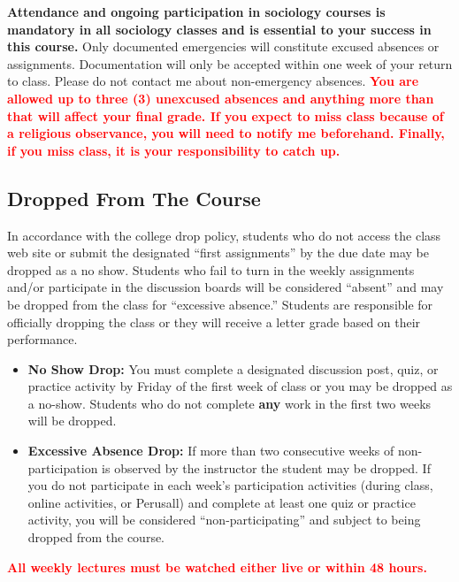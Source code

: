 \documentclass[11pt,]{article}
\begin{document}
\textbf{Attendance and ongoing participation in sociology courses is
mandatory in all sociology classes and is essential to your success in
this course.} Only documented emergencies will constitute excused
absences or assignments. Documentation will only be accepted within one
week of your return to class. Please do not contact me about
non-emergency absences.
\textcolor{red}{\bf{You are allowed up to three (3) unexcused absences and anything more than that will affect your final grade. If you expect to miss class because of a religious observance, you will need to notify me beforehand. Finally, if you miss class, it is your responsibility to catch up.}}

\hypertarget{dropped-from-the-course}{%
\subsection{Dropped From The Course}\label{dropped-from-the-course}}

In accordance with the college drop policy, students who do not access
the class web site or submit the designated ``first assignments'' by the
due date may be dropped as a no show. Students who fail to turn in the
weekly assignments and/or participate in the discussion boards will be
considered ``absent'' and may be dropped from the class for ``excessive
absence.'' Students are responsible for officially dropping the class or
they will receive a letter grade based on their performance.

\begin{itemize}
\item
  \textbf{No Show Drop:} You must complete a designated discussion post,
  quiz, or practice activity by Friday of the first week of class or you
  may be dropped as a no-show. Students who do not complete \textbf{any}
  work in the first two weeks will be dropped.
\item
  \textbf{Excessive Absence Drop:} If more than two consecutive weeks of
  non-participation is observed by the instructor the student may be
  dropped. If you do not participate in each week's participation
  activities (during class, online activities, or Perusall) and complete
  at least one quiz or practice activity, you will be considered
  ``non-participating'' and subject to being dropped from the course.
\end{itemize}

\textcolor{red}{\bf{All weekly lectures must be watched either live or within 48 hours.}}
\end{document}
